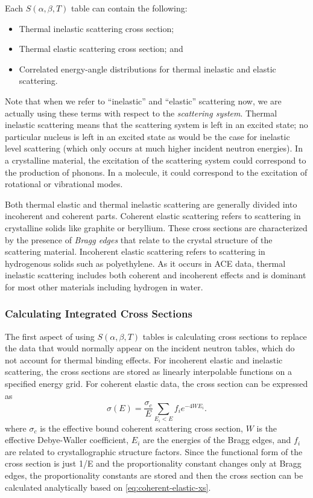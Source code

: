 Each $S(\alpha,\beta,T)$ table can contain the following:
\begin{itemize}
\item Thermal inelastic scattering cross section;
\item Thermal elastic scattering cross section; and
\item Correlated energy-angle distributions for thermal inelastic and elastic
  scattering.
\end{itemize}
Note that when we refer to ``inelastic'' and ``elastic'' scattering now, we are
actually using these terms with respect to the \emph{scattering system}. Thermal
inelastic scattering means that the scattering system is left in an excited
state; no particular nucleus is left in an excited state as would be the case
for inelastic level scattering (which only occurs at much higher incident
neutron energies). In a crystalline material, the excitation of the scattering
system could correspond to the production of phonons. In a molecule, it could
correspond to the excitation of rotational or vibrational modes.

Both thermal elastic and thermal inelastic scattering are generally divided into
incoherent and coherent parts. Coherent elastic scattering refers to scattering
in crystalline solids like graphite or beryllium. These cross sections are
characterized by the presence of \emph{Bragg edges} that relate to the crystal
structure of the scattering material. Incoherent elastic scattering refers to
scattering in hydrogenous solids such as polyethylene. As it occurs in ACE data,
thermal inelastic scattering includes both coherent and incoherent effects and
is dominant for most other materials including hydrogen in water.

\subsubsection{Calculating Integrated Cross Sections}

The first aspect of using $S(\alpha,\beta,T)$ tables is calculating
cross sections to replace the data that would normally appear on the incident
neutron tables, which do not account for thermal binding effects. For incoherent
elastic and inelastic scattering, the cross sections are stored as linearly
interpolable functions on a specified energy grid. For coherent elastic data,
the cross section can be expressed as
\begin{equation}
  \label{eq:coherent-elastic-xs}
  \sigma(E) = \frac{\sigma_c}{E} \sum_{E_i < E} f_i e^{-4WE_i}.
\end{equation}
where $\sigma_c$ is the effective bound coherent scattering cross section, $W$
is the effective Debye-Waller coefficient, $E_i$ are the energies of the Bragg
edges, and $f_i$ are related to crystallographic structure factors. Since the
functional form of the cross section is just 1/E and the proportionality
constant changes only at Bragg edges, the proportionality constants are stored
and then the cross section can be calculated analytically based on
\eqref{eq:coherent-elastic-xs}.

